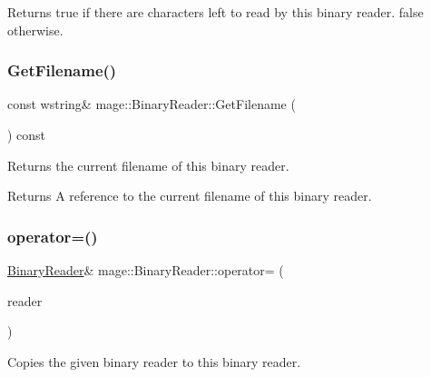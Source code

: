 \begin{DoxyReturn}{Returns}
{\ttfamily true} if there are characters left to read by this binary reader. {\ttfamily false} otherwise. 
\end{DoxyReturn}
\mbox{\label{classmage_1_1_binary_reader_ad9d4a4a3e2f0afc666d15badff08fe4a}} 
\subsubsection{\texorpdfstring{Get\+Filename()}{GetFilename()}}
{\footnotesize\ttfamily const wstring\& mage\+::\+Binary\+Reader\+::\+Get\+Filename (\begin{DoxyParamCaption}{ }\end{DoxyParamCaption}) const\hspace{0.3cm}{\ttfamily [noexcept]}}

Returns the current filename of this binary reader.

\begin{DoxyReturn}{Returns}
A reference to the current filename of this binary reader. 
\end{DoxyReturn}
\mbox{\label{classmage_1_1_binary_reader_a0408bb456983b4a03ae42ab69c6f4bc3}} 
\subsubsection{\texorpdfstring{operator=()}{operator=()}\hspace{0.1cm}{\footnotesize\ttfamily [1/2]}}
{\footnotesize\ttfamily \mbox{\hyperlink{classmage_1_1_binary_reader}{Binary\+Reader}}\& mage\+::\+Binary\+Reader\+::operator= (\begin{DoxyParamCaption}\item[{const \mbox{\hyperlink{classmage_1_1_binary_reader}{Binary\+Reader}} \&}]{reader }\end{DoxyParamCaption})\hspace{0.3cm}{\ttfamily [delete]}}

Copies the given binary reader to this binary reader.


